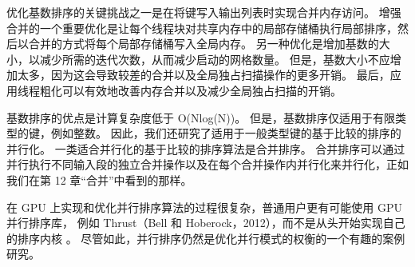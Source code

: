 优化基数排序的关键挑战之一是在将键写入输出列表时实现合并内存访问。 
增强合并的一个重要优化是让每个线程块对共享内存中的局部存储桶执行局部排序，然后以合并的方式将每个局部存储桶写入全局内存。 
另一种优化是增加基数的大小，以减少所需的迭代次数，从而减少启动的网格数量。 
但是，基数大小不应增加太多，因为这会导致较差的合并以及全局独占扫描操作的更多开销。 
最后，应用线程粗化可以有效地改善内存合并以及减少全局独占扫描的开销。

基数排序的优点是计算复杂度低于 O(Nlog(N))。 但是，基数排序仅适用于有限类型的键，例如整数。 
因此，我们还研究了适用于一般类型键的基于比较的排序的并行化。 一类适合并行化的基于比较的排序算法是合并排序。 
合并排序可以通过并行执行不同输入段的独立合并操作以及在每个合并操作内并行化来并行化，正如我们在第 12 章“合并”中看到的那样。

在 GPU 上实现和优化并行排序算法的过程很复杂，普通用户更有可能使用 GPU 并行排序库，
例如 Thrust（Bell 和 Hoberock，2012），而不是从头开始实现自己的排序内核 。 
尽管如此，并行排序仍然是优化并行模式的权衡的一个有趣的案例研究。
